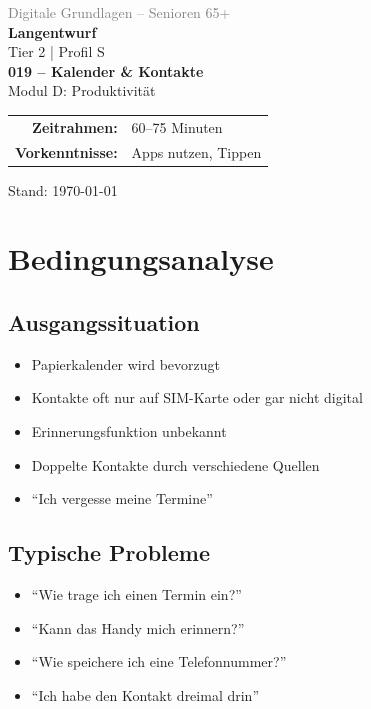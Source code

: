 \documentclass[11pt,a4paper]{article}
\begin{document}
\begin{titlepage}
    \centering
    \vspace*{2cm}
    {\Large\textcolor{gray}{Digitale Grundlagen -- Senioren 65+}}\\[2cm]
    {\Huge\textcolor{fach}{\textbf{Langentwurf}}}\\[0.5cm]
    {\large Tier 2 | Profil S}\\[2cm]
    {\LARGE\textbf{019 -- Kalender \& Kontakte}}\\[0.5cm]
    {\large Modul D: Produktivität}\\[2cm]
    \begin{tabular}{rl}
        \textbf{Zeitrahmen:} & 60--75 Minuten \\
        \textbf{Vorkenntnisse:} & Apps nutzen, Tippen \\
    \end{tabular}
    \vfill
    {\normalsize Stand: \today}
\end{titlepage}

\tableofcontents
\newpage

\section{Bedingungsanalyse}

\subsection{Ausgangssituation}
\begin{itemize}
    \item Papierkalender wird bevorzugt
    \item Kontakte oft nur auf SIM-Karte oder gar nicht digital
    \item Erinnerungsfunktion unbekannt
    \item Doppelte Kontakte durch verschiedene Quellen
    \item ``Ich vergesse meine Termine''
\end{itemize}

\subsection{Typische Probleme}
\begin{itemize}
    \item ``Wie trage ich einen Termin ein?''
    \item ``Kann das Handy mich erinnern?''
    \item ``Wie speichere ich eine Telefonnummer?''
    \item ``Ich habe den Kontakt dreimal drin''
\end{itemize}
\end{document}
